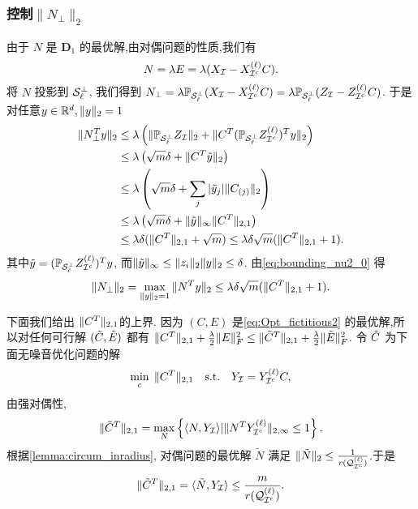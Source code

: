 \subsubsection{控制\(\|N_{\perp}\|_2\)}
由于 \(N\) 是 \(\mathbf{D}_1\) 的最优解,由对偶问题的性质,我们有
\[ N=\lambda E=\lambda(X_{\mathcal{I}}-X^{(\ell)}_{\mathcal{I}^c}C). \]
将 \(N\) 投影到 \(\mathcal{S}^{\perp}_{\ell}\), 我们得到
\(N_{\perp}=\lambda \mathbb{P}_{\mathcal{S}_{\ell}^{\perp}}(X_{\mathcal{I}}-X^{(\ell)}_{\mathcal{I}^c}C)
= \lambda \mathbb{P}_{\mathcal{S}_{\ell}^{\perp}}(Z_{\mathcal{I}}-Z^{(\ell)}_{\mathcal{I}^c}C)\).
于是对任意\(y\in \mathbb{R}^d, \|y\|_2=1\)
\begin{align}
  \|N_{\perp}^T y\|_2 & \leq\lambda \left(\|\mathbb{P}_{\mathcal{S}_{\ell}^{\perp}}Z_{\mathcal{I}}\|_2
  +\|C^T (\mathbb{P}_{\mathcal{S}_{\ell}^{\perp}}Z^{(\ell)}_{\mathcal{I}^c})^T y\|_2\right)\nonumber\\
  & \leq \lambda\left( \sqrt{m} \delta + \|C^T \tilde{y}\|_2\right) \nonumber\\
  & \leq \lambda\left( \sqrt{m} \delta + \sum_j |\tilde{y}_j|\|C_{(j)}\|_2\right) \nonumber\\
  & \leq \lambda\left( \sqrt{m} \delta + \|\tilde{y}\|_{\infty}\|C^T\|_{2,1}\right) \nonumber\\
  & \leq \lambda \delta(\|C^T\|_{2,1}+\sqrt{m}) \leq \lambda\delta\sqrt{m}(\|C^T\|_{2,1}+1).
  \label{eq:bounding_nu2_0}
\end{align}
其中\(\tilde{y}=(\mathbb{P}_{\mathcal{S}_{\ell}^{\perp}}Z^{(\ell)}_{\mathcal{I}^c})^Ty\),
而\(\|\tilde{y}\|_\infty \leq \|z_i\|_2 \|y\|_2 \leq
\delta\). 由\eqref{eq:bounding_nu2_0} 得
\begin{align}
  \|N_{\perp}\|_2 = \max_{\|y\|_2=1} \|N^T y\|_2 \le \lambda\delta\sqrt{m}(\|C^T\|_{2,1}+1).
  \label{eq:bounding_nu2}
\end{align}

下面我们给出 \(\|C^T\|_{2,1}\)的上界.
因为 \((C,E)\) 是\eqref{eq:Opt_fictitious2} 的最优解,所以对任何可行解 \((\tilde{C} ,\tilde{E})\)
都有 \(\|C^T\|_{2,1}+\frac{\lambda}{2}\|E\|^2_F \leq \|\tilde{C}^T\|_{2,1}+\frac{\lambda}{2}\|\tilde{E}\|_F^2\).
令 \(\tilde{C}\) 为下面无噪音优化问题的解
\begin{align}\label{eq:Opt_y only}
\min_{c} \; \|C^T\|_{2,1} \quad
\text{s.t.} \quad Y_{\mathcal{I}}=Y^{(\ell)}_{\mathcal{I}^c}C,
\end{align}
由强对偶性,
\[\|\tilde{C}^T\|_{2,1} = \max_{N}\left\{\langle N,Y_{\mathcal{I}}\rangle | \|N^T
Y^{(\ell)}_{\mathcal{I}^c}\|_{2, \infty}\leq 1\right\}.\]
根据\autoref{lemma:circum_inradius},   对偶问题的最优解 \(\tilde{N}\) 满足
\(\|\tilde{N}\|_2 \leq \frac{1}{r(\mathcal{Q}_{\mathcal{I}^c}^{(\ell)})}\).于是
\[\|\tilde{C}^T\|_{2,1} = \langle\tilde{N},Y_{\mathcal{I}}\rangle \leq
\frac{m}{r(\mathcal{Q}_{\mathcal{I}^c}^{(\ell)})}.\]


